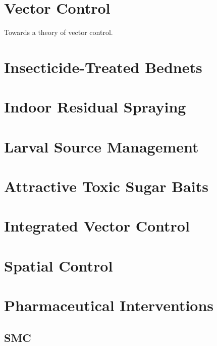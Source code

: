 \documentclass[
]{book}
\begin{document}
\hypertarget{vector-control-1}{%
\chapter{Vector Control}\label{vector-control-1}}

Towards a theory of vector control.

\hypertarget{insecticide-treated-bednets}{%
\chapter{Insecticide-Treated Bednets}\label{insecticide-treated-bednets}}

\hypertarget{indoor-residual-spraying}{%
\chapter{Indoor Residual Spraying}\label{indoor-residual-spraying}}

\hypertarget{larval-source-management}{%
\chapter{Larval Source Management}\label{larval-source-management}}

\hypertarget{attractive-toxic-sugar-baits}{%
\chapter{Attractive Toxic Sugar Baits}\label{attractive-toxic-sugar-baits}}

\hypertarget{integrated-vector-control-1}{%
\chapter{Integrated Vector Control}\label{integrated-vector-control-1}}

\hypertarget{spatial-control}{%
\chapter{Spatial Control}\label{spatial-control}}

\hypertarget{pharmaceutical-interventions-1}{%
\chapter{Pharmaceutical Interventions}\label{pharmaceutical-interventions-1}}

\hypertarget{smc-1}{%
\section{SMC}\label{smc-1}}
\end{document}
